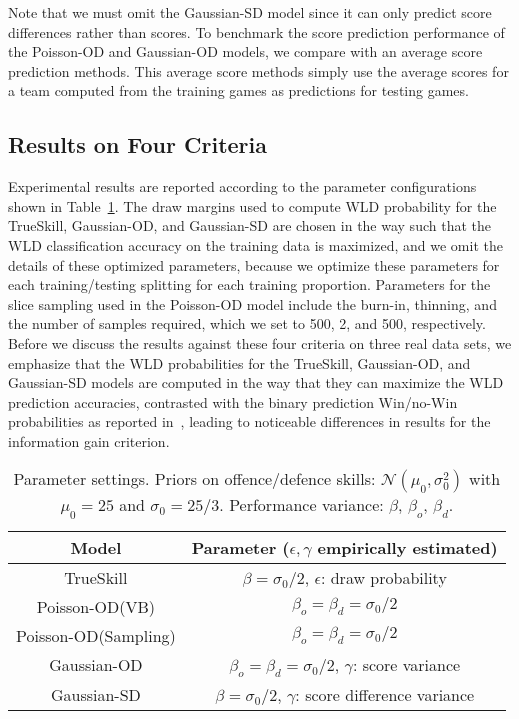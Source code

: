 Note that we must omit the Gaussian-SD model since it can only predict score differences rather than scores. To benchmark the score prediction performance of the Poisson-OD and Gaussian-OD models, we compare with an average score prediction methods. This average score methods simply use the average scores for a team computed from the training games as predictions for testing games.

\subsection{Results on Four Criteria}
\label{sec:results}

Experimental results are reported according to the parameter configurations shown in Table~\ref{table:Parameters}. The draw margins used to compute WLD probability for the TrueSkill, Gaussian-OD, and Gaussian-SD are chosen in the way such that the WLD classification accuracy on the training data is maximized, and we omit the details of these optimized parameters, because we optimize these parameters for each training/testing splitting for each training proportion. Parameters for the slice sampling used in the Poisson-OD model include the burn-in, thinning, and the number of samples required, which we set to 500, 2, and 500, respectively. Before we discuss the results against these four criteria on three real data sets, we emphasize that the WLD probabilities for the TrueSkill, Gaussian-OD, and Gaussian-SD models are computed in the way that they can maximize the WLD prediction accuracies, contrasted with the binary prediction Win/no-Win probabilities as reported in~\cite{Guo:ECML2012}, leading to noticeable differences in results for the information gain criterion. 
\begin{table}[htbp!]
\caption{Parameter settings. Priors on offence/defence skills: $\mathcal{N}(\mu_{0},\sigma_{0}^2)$ with $\mu_{0}=25$ and $\sigma_{0}=25/3$. Performance variance: $\beta$, $\beta_o$, $\beta_d$.}
\begin{center}
\small
\begin{tabular}{cc}
  \hline
  Model             & Parameter ($\epsilon,\gamma$ empirically estimated)\\
  \hline
  TrueSkill          & $\beta=\sigma_{0}/2$, $\epsilon$: draw probability\\
  Poisson-OD(VB)         & $\beta_o=\beta_d=\sigma_{0}/2$\\
  Poisson-OD(Sampling)         & $\beta_o=\beta_d=\sigma_{0}/2$\\
  Gaussian-OD    & $\beta_o=\beta_d=\sigma_{0}/2$, $\gamma$: score variance\\
  Gaussian-SD & $\beta=\sigma_{0}/2$, $\gamma$: score difference variance\\
  \hline
\end{tabular}
\label{table:Parameters}
\end{center}
\end{table}



